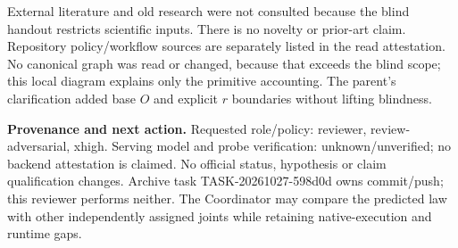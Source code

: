 \documentclass[10pt]{article}
\begin{document}
External literature and old research were not consulted because the blind handout restricts scientific inputs. There is no novelty or prior-art claim. Repository policy/workflow sources are separately listed in the read attestation. No canonical graph was read or changed, because that exceeds the blind scope; this local diagram explains only the primitive accounting. The parent's clarification added base $O$ and explicit $r$ boundaries without lifting blindness.

\textbf{Provenance and next action.} Requested role/policy: reviewer, review-adversarial, xhigh. Serving model and probe verification: unknown/unverified; no backend attestation is claimed. No official status, hypothesis or claim qualification changes. Archive task TASK-20261027-598d0d owns commit/push; this reviewer performs neither. The Coordinator may compare the predicted law with other independently assigned joints while retaining native-execution and runtime gaps.
\end{document}
